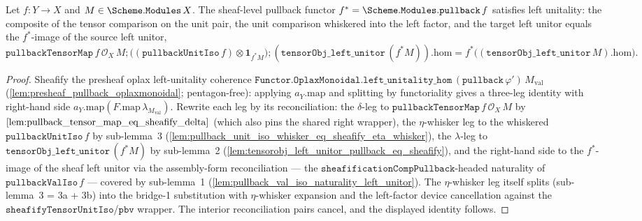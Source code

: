 \begin{lemma}

  \label{lem:pullback_tensor_map_left_unitality}
  Let \(f : Y \to X\) and \(M \in \Scheme.\mathtt{Modules}\,X\). The sheaf-level pullback functor
  \(f^{*} = \Scheme.\mathtt{Modules.pullback}\,f\) satisfies left unitality: the composite of the
  tensor comparison on the unit pair, the unit comparison whiskered into the left factor, and the
  target left unitor equals the \(f^{*}\)-image of the source left unitor,
  \[
    \mathtt{pullbackTensorMap}\,f\,\mathcal{O}_X\,M
      \mathbin{;} \bigl((\mathtt{pullbackUnitIso}\,f) \otimes \mathbf 1_{f^{*}M}\bigr)
      \mathbin{;} (\mathtt{tensorObj\_left\_unitor}\,(f^{*}M)).\mathrm{hom}
    = f^{*}\bigl((\mathtt{tensorObj\_left\_unitor}\,M).\mathrm{hom}\bigr).
  \]
\end{lemma}
\begin{proof}
  Sheafify the presheaf oplax left-unitality coherence
  \(\mathtt{Functor.OplaxMonoidal.left\_unitality\_hom}\,(\mathtt{pullback}\,\varphi')\,
  M_{\mathrm{val}}\) (\cref{lem:presheaf_pullback_oplaxmonoidal}; pentagon-free): applying
  \(a_Y.\mathrm{map}\) and splitting by functoriality gives a three-leg identity with right-hand side
  \(a_Y.\mathrm{map}(F.\mathrm{map}\,\lambda_{M_{\mathrm{val}}})\). Rewrite each leg by its
  reconciliation: the \(\delta\)-leg to \(\mathtt{pullbackTensorMap}\,f\,\mathcal{O}_X\,M\) by
  \(\cref{lem:pullback_tensor_map_eq_sheafify_delta}\) (which also pins the shared right wrapper), the
  \(\eta\)-whisker leg to the whiskered \(\mathtt{pullbackUnitIso}\,f\) by sub-lemma~3
  (\cref{lem:pullback_unit_iso_whisker_eq_sheafify_eta_whisker}), the \(\lambda\)-leg to
  \(\mathtt{tensorObj\_left\_unitor}\,(f^{*}M)\) by sub-lemma~2
  (\cref{lem:tensorobj_left_unitor_pullback_eq_sheafify}), and the right-hand side to the
  \(f^{*}\)-image of the sheaf left unitor via the assembly-form reconciliation --- the
  \(\mathtt{sheafificationCompPullback}\)-headed naturality of \(\mathtt{pullbackValIso}\,f\) ---
  covered by sub-lemma~1 (\cref{lem:pullback_val_iso_naturality_left_unitor}). The
  \(\eta\)-whisker leg itself splits (sub-lemma~3 = 3a + 3b) into the bridge-1 substitution with
  \(\eta\)-whisker expansion and the left-factor device cancellation against the
  \(\mathtt{sheafifyTensorUnitIso}\)/\(\mathtt{pbv}\) wrapper. The interior reconciliation pairs
  cancel, and the displayed identity follows.
\end{proof}

